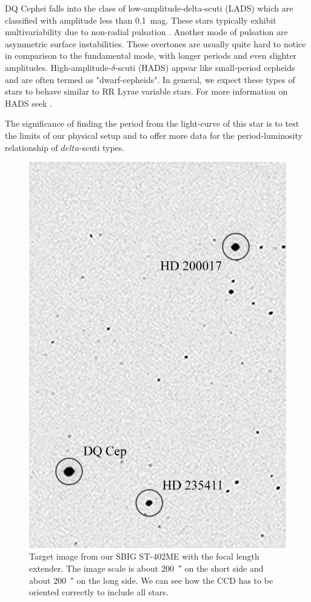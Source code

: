 \documentclass[%
aip,
jmp,
reprint,
floatfix,
nofootinbib
]{revtex4-1}
\begin{document}
	DQ Cephei falls into the class of low-amplitude-delta-scuti (LADS) which are classified with amplitude less than \SI{0.1}{mag}. These stars typically exhibit multivariability due to non-radial pulsation \citep{1937LicOB..18...77F, 1938ApJ....87..133S}. Another mode of pulsation are asymmetric surface instabilities. These overtones are usually quite hard to notice in comparison to the fundamental mode, with longer periods and even slighter amplitudes. High-amplitude-$\delta$-scuti (HADS) appear like small-period cepheids and are often termed as "dwarf-cepheids". In general, we expect these types of stars to behave similar to RR Lyrae variable stars. For more information on HADS seek \citet{1997PASP..109.1221M}. 
	
	The significance of finding the period from the light-curve of this star is to test the limits of our physical setup and to offer more data for the period-luminosity relationship of $delta$-scuti types.
	
	\begin{table}[t]
		\centering
		\label{tab:info}
		
	\end{table}

	\begin{figure}
		\centering
		\includegraphics[width=.8\linewidth]{figs/map.png}
		\caption{Target image from our SBIG ST-402ME with the focal length extender. The image scale is about \SI{200}{\arcsecond} on the short side and about \SI{200}{\arcsecond} on the long side. We can see how the CCD has to be oriented correctly to include all stars.}
		\label{fig:map}
	\end{figure}
	
\end{document}
